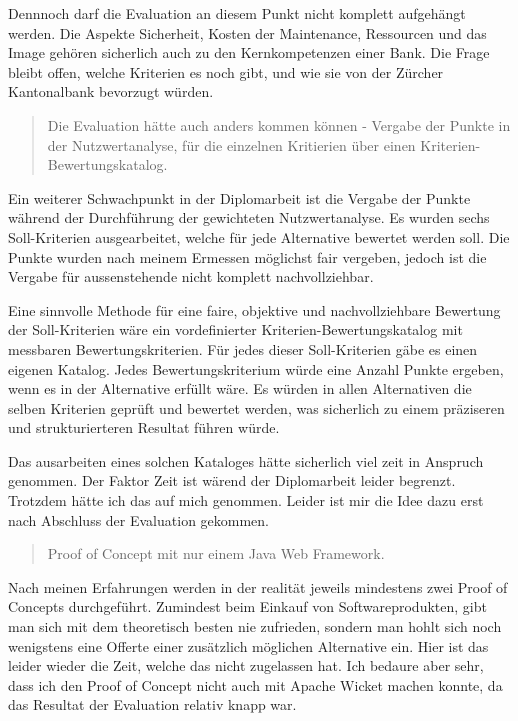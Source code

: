 Dennnoch darf die Evaluation an diesem Punkt nicht komplett aufgehängt werden.
Die Aspekte Sicherheit, Kosten der Maintenance, Ressourcen und das Image gehören
sicherlich auch zu den Kernkompetenzen einer Bank. Die Frage bleibt offen,
welche Kriterien es noch gibt, und wie sie von der Zürcher Kantonalbank
bevorzugt würden.
\newline

\clearpage
  
\begin{quote}\begin{itshape}Die Evaluation hätte auch anders kommen können -
Vergabe der Punkte in der Nutzwertanalyse, für die einzelnen Kritierien über
einen Kriterien-Bewertungskatalog.\end{itshape}\end{quote}

Ein weiterer Schwachpunkt in der Diplomarbeit ist die Vergabe der Punkte während
der Durchführung der gewichteten Nutzwertanalyse. Es wurden sechs Soll-Kriterien
ausgearbeitet, welche für jede Alternative bewertet werden soll. Die Punkte
wurden nach meinem Ermessen möglichst fair vergeben, jedoch ist die Vergabe für
aussenstehende nicht komplett nachvollziehbar.

Eine sinnvolle Methode für eine faire, objektive und nachvollziehbare Bewertung
der Soll-Kriterien wäre ein vordefinierter Kriterien-Bewertungskatalog mit
messbaren Bewertungskriterien. Für jedes dieser Soll-Kriterien gäbe es einen
eigenen Katalog. Jedes Bewertungskriterium würde eine Anzahl Punkte ergeben,
wenn es in der Alternative erfüllt wäre. Es würden in allen Alternativen die
selben Kriterien geprüft und bewertet werden, was sicherlich zu einem
präziseren und strukturierteren Resultat führen würde.

Das ausarbeiten eines solchen Kataloges hätte sicherlich viel zeit in Anspruch
genommen. Der Faktor Zeit ist wärend der Diplomarbeit leider begrenzt. Trotzdem
hätte ich das auf mich genommen. Leider ist mir die Idee dazu erst nach
Abschluss der Evaluation gekommen.
\newline
  
\begin{quote}\begin{itshape}Proof of Concept mit nur einem Java Web
Framework.\end{itshape}\end{quote}

Nach meinen Erfahrungen werden in der realität jeweils mindestens zwei Proof of
Concepts durchgeführt. Zumindest beim Einkauf von Softwareprodukten, gibt man
sich mit dem theoretisch besten nie zufrieden, sondern man hohlt sich noch
wenigstens eine Offerte einer zusätzlich möglichen Alternative ein. Hier ist das
leider wieder die Zeit, welche das nicht zugelassen hat. Ich bedaure aber sehr,
dass ich den Proof of Concept nicht auch mit Apache Wicket machen konnte, da das
Resultat der Evaluation relativ knapp war.
\newline


